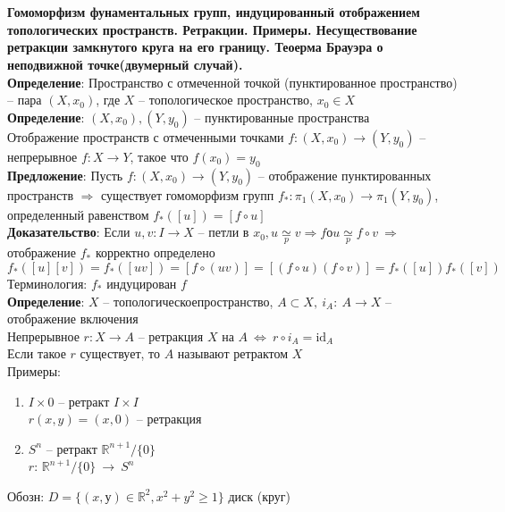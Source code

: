 \section{}
	\textbf{Гомоморфизм фунаментальных групп, индуцированный отображением топологических пространств. Ретракции. Примеры. Несуществование ретракции замкнутого круга на его границу. Теоерма Брауэра о неподвижной точке(двумерный случай).}\\
	\textbf{Определение}: Пространство с отмеченной точкой (пунктированное пространство) -- пара $(X, x_0)$, где $X$ -- топологическое пространство, $x_0 \in X$\\
	\textbf{Определение}: $(X, x_0), (Y, y_0)$ -- пунктированные пространства\\
	Отображение пространств с отмеченными точками $f: (X, x_0) \rightarrow (Y, y_0)$ -- непрерывное $f: X \rightarrow Y$, такое что $f(x_0) = y_0$\\
	\textbf{Предложение}: Пусть $f: (X, x_0) \rightarrow (Y, y_0)$ -- отображение пунктированных пространств $\Rightarrow$ существует гомоморфизм групп $f_*: \pi_1 (X,x_0) \rightarrow \pi_1 (Y,y_0)$, определенный равенством $f_*([u]) = [f \circ u]$\\
	\textbf{Доказательство}: Если $u, v: I \rightarrow X$ -- петли в $x_0, u \underset{p}{\simeq} v \Rightarrow fоu \underset{p}{\simeq} f \circ v\ \Rightarrow$ отображение $f_*$ корректно определено\\
	$f_*([u][v]) = f_*([uv]) = [f \circ (uv)] = [(f \circ u)(f \circ v)] = f_*([u])f_*([v])$\\
	Терминология: $f_*$ индуцирован $f$\\
	\textbf{Определение}: $X$ -- топологическоепространство, $A \subset X,\ i_A:\ A \rightarrow X$ -- отображение включения\\
	Непрерывное $r: X \rightarrow A$ -- ретракция $X$ на $A\ \Leftrightarrow\ r \circ i_A =  \text{id}_A$\\
	Если такое $r$ существует, то $A$ называют ретрактом $X$\\
	Примеры:
	\begin{enumerate}
		\item $I\times {0}$ -- ретракт $I\times I$\\
			$r(x,y) = (x,0)$ -- ретракция
		\item ${S}^n$ -- ретракт $\mathbb{R}^{n+1}\slash\{0\}$\\
			$r$: $\mathbb{R}^{n+1}\slash \{0\}\ \rightarrow\ {S}^n$
	\end{enumerate} 
	Обозн: $D = \{(x,у)\in \mathbb{R}^2, x^2+y^2\geq1\}$ диск (круг)\\
